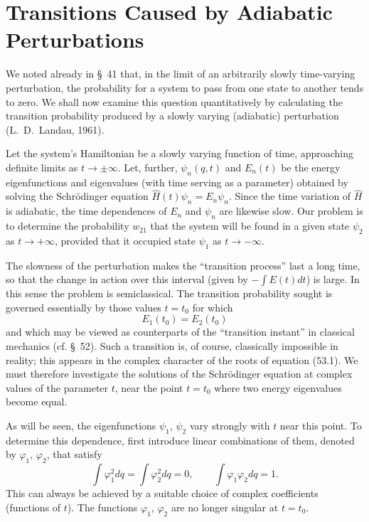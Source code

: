 \section{Transitions Caused by Adiabatic Perturbations}

We noted already in §~41 that, in the limit of an arbitrarily slowly time-varying perturbation, the probability for a system to pass from one state to another tends to zero. We shall now examine this question quantitatively by calculating the transition probability produced by a slowly varying (adiabatic) perturbation (L.~D.~Landau, 1961).

Let the system's Hamiltonian be a slowly varying function of time, approaching definite limits as $t\to\pm\infty$. Let, further, $\psi_n(q,t)$ and $E_n(t)$ be the energy eigenfunctions and eigenvalues (with time serving as a parameter) obtained by solving the Schrödinger equation $\widehat H(t)\psi_n=E_n\psi_n$. Since the time variation of $\widehat H$ is adiabatic, the time dependences of $E_n$ and $\psi_n$ are likewise
slow. Our problem is to determine the probability $w_{21}$ that the system will be found in a given state $\psi_2$ as $t\to+\infty$, provided that it occupied state $\psi_1$ as $t\to-\infty$.

The slowness of the perturbation makes the ``transition process'' last a long time, so that the change in action over this interval (given by $-\int E(t)dt$) is large. In this sense the problem is semiclassical. The transition probability sought is governed essentially by those values $t=t_0$ for which
\begin{equation}
 E_1(t_0)=E_2(t_0)
 \tag{53.1}
\end{equation}
and which may be viewed as counterparts of the ``transition instant'' in classical mechanics (cf. §~52). Such a transition is, of course, classically impossible in reality; this appears in the complex character of the roots of equation (53.1). We must therefore investigate the solutions of the Schrödinger equation at complex values of the parameter $t$, near the point $t=t_0$ where two energy eigenvalues become equal.

As will be seen, the eigenfunctions $\psi_1$, $\psi_2$ vary strongly with $t$ near this point. To determine this dependence, first introduce linear combinations of them, denoted by $\varphi_1$, $\varphi_2$, that satisfy
\begin{equation}
 \int\varphi_1^2dq=\int\varphi_2^2dq=0,\qquad
 \int\varphi_1\varphi_2dq=1.
 \tag{53.2}
\end{equation}
This can always be achieved by a suitable choice of complex coefficients (functions of $t$). The functions $\varphi_1$, $\varphi_2$ are no longer singular at $t=t_0$.

